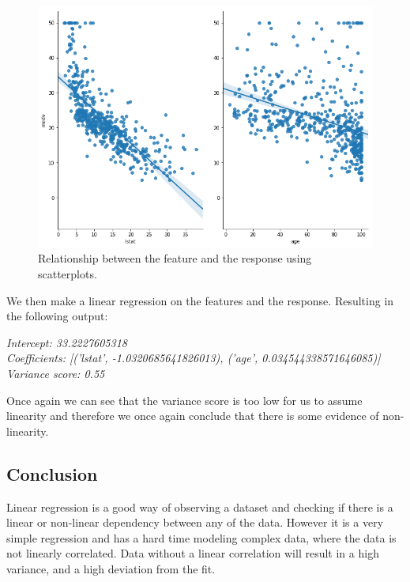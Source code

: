 \begin{figure}[h]
	\centering
	\includegraphics[scale=0.4]{regression/multipleLinearRegression/fig/bostonPairplotMdevLstatAge.png}
	\caption{Relationship between the feature and the response using scatterplots.}
	\label{fig:bostonPairplotMdevLstatAge}
\end{figure}

We then make a linear regression on the features and the response. Resulting in the following output:

\noindent\textit{Intercept: 33.2227605318\\
	Coefficients: [('lstat', -1.0320685641826013), ('age', 0.034544338571646085)]\\
	Variance score: 0.55\\}

Once again we can see that the variance score is too low for us to assume linearity and therefore we once again conclude that there is some evidence of non-linearity.

\subsection{Conclusion}
Linear regression is a good way of observing a dataset and checking if there is a linear or non-linear dependency between any of the data. However it is a very simple regression and has a hard time modeling complex data, where the data is not linearly correlated. Data without a linear correlation will result in a high variance, and a high deviation from the fit.